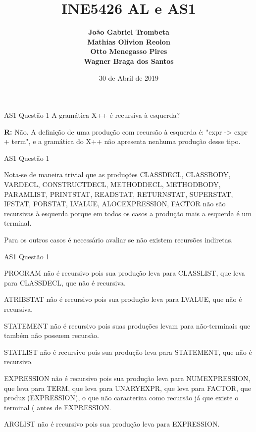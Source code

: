 \documentclass[10pt]{beamer}
\title{INE5426 AL e AS1}
\date{30 de Abril de 2019}
\author{\textbf{João Gabriel Trombeta}  \\
        \textbf{Mathias Olivion Reolon} \\
        \textbf{Otto Menegasso Pires}   \\
        \textbf{Wagner Braga dos Santos}
        }
\institute{Universidade Federal de Santa Catarina - UFSC}
\begin{document}
\begin{frame}
    \maketitle
\end{frame}

\begin{frame}{AS1 Questão 1}
    A gramática X++ é recursiva à esquerda?

    \textbf{R:} Não. A definição de uma produção com recursão à esquerda é:
    "expr -> expr + term", e a gramática do X++ não apresenta nenhuma produção
    desse tipo.

   \end{frame}

\begin{frame}{AS1 Questão 1}

    Nota-se de maneira trivial que as produções CLASSDECL, CLASSBODY, VARDECL,
    CONSTRUCTDECL, METHODDECL, METHODBODY, PARAMLIST, PRINTSTAT, READSTAT,
    RETURNSTAT, SUPERSTAT, IFSTAT, FORSTAT, LVALUE, ALOCEXPRESSION, FACTOR não
    são recursivas à esquerda porque em todos os casos a produção mais a
    esquerda é um terminal.

    Para os outros casos é necessário avaliar se não existem recursões indiretas.

\end{frame}

\begin{frame}{AS1 Questão 1}

    PROGRAM não é recursivo pois sua produção leva para CLASSLIST, que leva
    para CLASSDECL, que não é recursiva.

    ATRIBSTAT não é recursivo pois sua produção leva para LVALUE, que não é
    recursiva.

    STATEMENT não é recursivo pois suas produções levam para não-terminais que
    também não possuem recursão.

    STATLIST não é recursivo pois sua produção leva para STATEMENT, que não é
    recursivo.

    EXPRESSION não é recursivo pois sua produção leva para NUMEXPRESSION, que
    leva para TERM, que leva para UNARYEXPR, que leva para FACTOR, que produz
    (EXPRESSION), o que não caracteriza como recursão já que existe o terminal
    ( antes de EXPRESSION.

    ARGLIST não é recursivo pois sua produção leva para EXPRESSION.

\end{frame}
\end{document}
